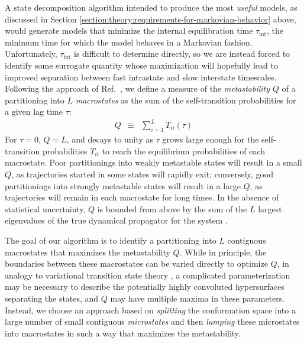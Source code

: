 A state decomposition algorithm intended to produce the most \emph{useful} models, as discussed in Section \ref{section:theory:requirements-for-markovian-behavior} above, would generate models that minimize the internal equilibration time $\tau_\mathrm{int}$, the minimum time for which the model behaves in a Markovian fashion.
Unfortunately, $\tau_\mathrm{int}$ is difficult to determine directly, so we are instead forced to identify some surrogate quantity whose maximization will hopefully lead to improved separation between fast intrastate and slow interstate timescales.
Following the approach of Ref.\ \cite{huisinga:2005a}, we define a measure of the \emph{metastability} $Q$ of a partitioning into $L$ \emph{macrostates} as the sum of the self-transition probabilities for a given lag time $\tau$:
\begin{eqnarray}
Q &\equiv& \sum_{i=1}^L T_{ii}(\tau) \label{equation:metastability}
\end{eqnarray}
For $\tau = 0$, $Q = L$, and decays to unity as $\tau$ grows large enough for the self-transition probabilities $T_{ii}$ to reach the equilibrium probabilities of each macrostate.
Poor partitionings into weakly metastable states will result in a small $Q$, as trajectories started in some states will rapidly exit; conversely, good partitionings into strongly metastable states will result in a large $Q$, as trajectories will remain in each macrostate for long times.
In the absence of statistical uncertainty, $Q$ is bounded from above by the sum of the $L$ largest eigenvalues of the true dynamical propagator for the system \cite{huisinga:2005a}.

The goal of our algorithm is to identify a partitioning into $L$ contiguous macrostates that maximizes the metastability $Q$.
While in principle, the boundaries between these macrostates can be varied directly to optimize $Q$, in analogy to variational transition state theory \cite{truhlar:1996a}, a complicated parameterization may be necessary to describe the potentially highly convoluted hypersurfaces separating the states, and $Q$ may have multiple maxima in these parameters.
Instead, we choose an approach based on \emph{splitting} the conformation space into a large number of small contiguous \emph{microstates} and then \emph{lumping} these microstates into macrostates in such a way that maximizes the metastability.

